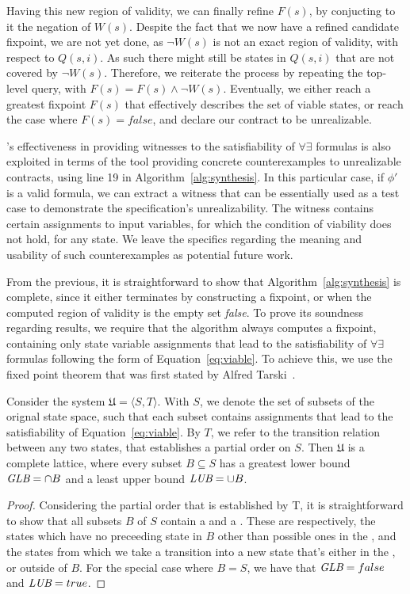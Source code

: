 Having this new region of validity, we can finally refine $F(s)$, by conjucting
to it the negation of $W(s)$. Despite the fact that we now have a refined
candidate fixpoint, we are not yet done, as $\lnot W(s)$ is not an exact region
of validity, with respect to $Q(s,i)$. As such there might still be states in
$Q(s,i)$ that are not covered by $\lnot W(s)$. Therefore, we reiterate the
process by repeating the top-level \aeval query, with $F(s) = F(s) \land \lnot
W(s)$. Eventually, we either reach a greatest fixpoint $F(s)$ that effectively
describes the set of viable states, or reach the case where $F(s) = false$, and
declare our contract to be unrealizable.

\aeval's effectiveness in providing witnesses to the
satisfiability of $\forall\exists$ formulas is also exploited in terms of the
tool providing concrete counterexamples to unrealizable contracts, using line 19
in Algorithm~\ref{alg:synthesis}. In this particular case, if $\phi'$ is a valid
formula, we can extract a witness that can be essentially used as a test case to
demonstrate the specification's unrealizability. The witness contains
certain assignments to input variables, for which the condition of viability does not
hold, for any state. We leave the specifics regarding the meaning and usability
of such counterexamples as potential future work.

From the previous, it is straightforward to show that
Algorithm~\ref{alg:synthesis} is complete, since it either terminates by
constructing a fixpoint, or when the computed region of validity is the empty
set \textit{false}. To prove its soundness regarding results, we require that
the algorithm always computes a fixpoint, containing only state variable assignments that lead to the satisfiability of $\forall\exists$
formulas following the form of Equation~\ref{eq:viable}. To achieve this, we
use the fixed point theorem that was first stated by Alfred Tarski~\cite{tarski1955lattice}.

\begin{lemma} Consider the system
$\mathfrak{U} = \langle S, T \rangle$. With $S$, we denote the set of
subsets of the orignal state space, such that each subset contains assignments that lead to the
satisfiability of Equation~\ref{eq:viable}. By $T$, we refer to the
transition relation between any two states, that establishes a partial order
on $S$. Then $\mathfrak{U}$ is a complete lattice, where every subset $B \subseteq
S$ has a greatest lower bound  $\textit {GLB} = \cap B$  and a least upper
bound $\textit {LUB} = \cup B$.
\label{lem:lattice}
\end{lemma}
\begin{proof}
Considering the partial order that is established by T, it is straightforward
to show that all subsets $B$ of $S$ contain a \glb and a \lub. These
are respectively, the states which have no preceeding state in $B$ other than
possible ones in the \glb, and the states from which we take a transition into
a new state that's either in the \lub, or outside of $B$. For the special case
where $B = S$, we have that $\textit {GLB} = false$ and $\textit {LUB} = true$.
\end{proof}

